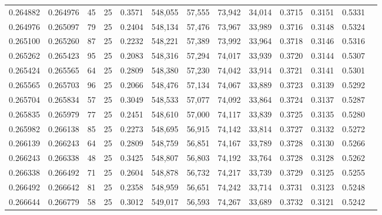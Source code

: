 \begin{tabular}{rrrrrrrrrrrrr}
0.264882 & 0.264976 &    45 &  25 &                                     0.3571 & 548,055 &  57,555 &  73,942 &  34,014 & 0.3715 & 0.3151 & 0.5331 \\
0.264976 & 0.265097 &    79 &  25 &                                     0.2404 & 548,134 &  57,476 &  73,967 &  33,989 & 0.3716 & 0.3148 & 0.5324 \\
0.265100 & 0.265260 &    87 &  25 &                                     0.2232 & 548,221 &  57,389 &  73,992 &  33,964 & 0.3718 & 0.3146 & 0.5316 \\
0.265262 & 0.265423 &    95 &  25 &                                     0.2083 & 548,316 &  57,294 &  74,017 &  33,939 & 0.3720 & 0.3144 & 0.5307 \\
0.265424 & 0.265565 &    64 &  25 &                                     0.2809 & 548,380 &  57,230 &  74,042 &  33,914 & 0.3721 & 0.3141 & 0.5301 \\
0.265565 & 0.265703 &    96 &  25 &                                     0.2066 & 548,476 &  57,134 &  74,067 &  33,889 & 0.3723 & 0.3139 & 0.5292 \\
0.265704 & 0.265834 &    57 &  25 &                                     0.3049 & 548,533 &  57,077 &  74,092 &  33,864 & 0.3724 & 0.3137 & 0.5287 \\
0.265835 & 0.265979 &    77 &  25 &                                     0.2451 & 548,610 &  57,000 &  74,117 &  33,839 & 0.3725 & 0.3135 & 0.5280 \\
0.265982 & 0.266138 &    85 &  25 &                                     0.2273 & 548,695 &  56,915 &  74,142 &  33,814 & 0.3727 & 0.3132 & 0.5272 \\
0.266139 & 0.266243 &    64 &  25 &                                     0.2809 & 548,759 &  56,851 &  74,167 &  33,789 & 0.3728 & 0.3130 & 0.5266 \\
0.266243 & 0.266338 &    48 &  25 &                                     0.3425 & 548,807 &  56,803 &  74,192 &  33,764 & 0.3728 & 0.3128 & 0.5262 \\
0.266338 & 0.266492 &    71 &  25 &                                     0.2604 & 548,878 &  56,732 &  74,217 &  33,739 & 0.3729 & 0.3125 & 0.5255 \\
0.266492 & 0.266642 &    81 &  25 &                                     0.2358 & 548,959 &  56,651 &  74,242 &  33,714 & 0.3731 & 0.3123 & 0.5248 \\
0.266644 & 0.266779 &    58 &  25 &                                     0.3012 & 549,017 &  56,593 &  74,267 &  33,689 & 0.3732 & 0.3121 & 0.5242 \\

\end{tabular}
